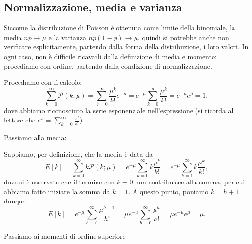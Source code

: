 \documentclass{report}
\begin{document}
\subsection{Normalizzazione, media e varianza}
Siccome la distribuzione di Poisson è ottenuta come limite della binomiale, la media $np \to \mu$ e la varianza $np(1-p) \to \mu$, quindi si potrebbe anche non verificare esplicitamente, partendo dalla forma della distribuzione, i loro valori. In ogni caso, non è difficile ricavarli dalla definizione di media e momento: procediamo con ordine, partendo dalla condizione di normalizzazione.
\begin{myproof}
Procediamo con il calcolo:
$$
	\sum_{k=0}^{\infty} \mathcal{P}(k; \mu) = \sum_{k=0}^{\infty} \frac{\mu^k}{k!} e^{-\mu} = e^{- \mu} \sum_{k=0}^{\infty} \frac{\mu^k}{k!} = e^{-\mu} e^{\mu} = 1,
$$
dove abbiamo riconosciuto la serie esponenziale nell'espressione (si ricorda al lettore che $e^x = \sum_{k=0}^{\infty} \frac{x^k}{k!}$). 
\end{myproof}
Passiamo alla media:
\begin{myproof}
Sappiamo, per definizione, che la media è data da
$$
E[k] = \sum_{k=0}^{\infty} k \mathcal{P}(k; \mu) = e^{-\mu} \sum_{k=0}^{\infty} k \frac{\mu^k}{k!} = e^{-\mu} \sum_{k=1}^{\infty} k \frac{\mu^k}{k!},
$$
dove si è osservato che il termine con $k=0$ non contribuisce alla somma, per cui abbiamo fatto iniziare la somma da $k=1$. A questo punto, poniamo $k = h + 1$ dunque
$$
E[k] = e^{-\mu} \sum_{h=0}^{\infty} \frac{\mu^{h+1}}{h!} = \mu e^{-\mu} \sum_{h=0}^{\infty} \frac{\mu^h}{h!} = \mu e^{-\mu} e^{\mu} = \mu.
$$
\end{myproof}
Passiamo ai momenti di ordine superiore
\end{document}
